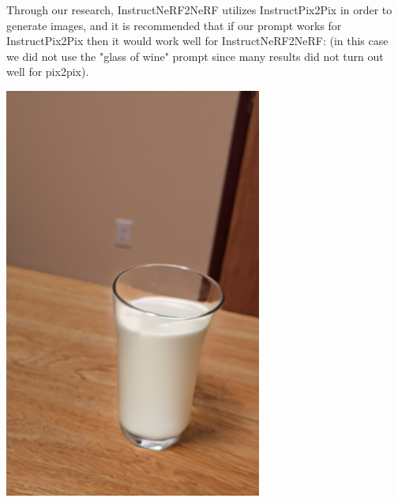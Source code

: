 \documentclass{article}
\begin{document}
Through our research, InstructNeRF2NeRF utilizes InstructPix2Pix in order to generate images, and it is recommended that if our prompt works for InstructPix2Pix then it would work well for InstructNeRF2NeRF: (in this case we did not use the "glass of wine" prompt since many results did not turn out well for pix2pix).

\begin{center}
    \begin{tcolorbox}[
                      boxsep=0pt,
                      top=2pt,
                      colback=red!5!white,
                      colframe=red!75!black,
                      center title,
                      autowidth title=transform the water into milk
                      ]
        \begin{center}
            \includegraphics[scale=0.15]{images/milk.png}
        \end{center}
    \end{tcolorbox}


\end{center}
\end{document}
